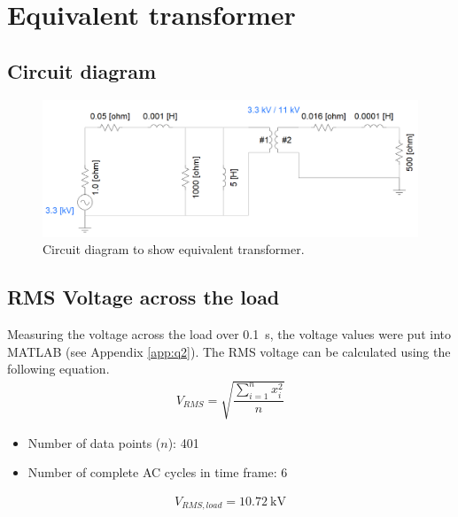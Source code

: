\section{Equivalent transformer}
\subsection{Circuit diagram}
\begin{figure}[H]
    \centering
    \includegraphics[width = \textwidth]{img/figure5.png}
    \caption{Circuit diagram to show equivalent transformer.}
    \label{fig:transformerCircuit}
\end{figure}
\subsection{RMS Voltage across the load}
Measuring the voltage across the load over \SI{0.1}{\second}, the voltage values were put into MATLAB (see Appendix \ref{app:q2}). The RMS voltage can be calculated using the following equation.
\begin{gather}
    V_{RMS} = \sqrt{\dfrac{\sum_{i=1}^n x_i^2}{n}}
\end{gather}
\begin{itemize}
    \item Number of data points ($n$): 401
    \item Number of complete AC cycles in time frame: 6
\end{itemize}
\begin{gather}
    V_{RMS,load} = \SI{10.72}{\kilo\volt}
\end{gather}
